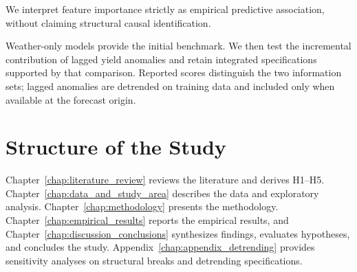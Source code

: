 We interpret feature importance strictly as empirical predictive association, without claiming structural causal identification.

Weather-only models provide the initial benchmark. We then test the incremental contribution of lagged yield anomalies and retain integrated specifications supported by that comparison. Reported scores distinguish the two information sets; lagged anomalies are detrended on training data and included only when available at the forecast origin.

\section{Structure of the Study}
\label{sec:intro_structure}

Chapter~\ref{chap:literature_review} reviews the literature and derives H1--H5. Chapter~\ref{chap:data_and_study_area} describes the data and exploratory analysis. Chapter~\ref{chap:methodology} presents the methodology. Chapter~\ref{chap:empirical_results} reports the empirical results, and Chapter~\ref{chap:discussion_conclusions} synthesizes findings, evaluates hypotheses, and concludes the study. Appendix~\ref{chap:appendix_detrending} provides sensitivity analyses on structural breaks and detrending specifications.
